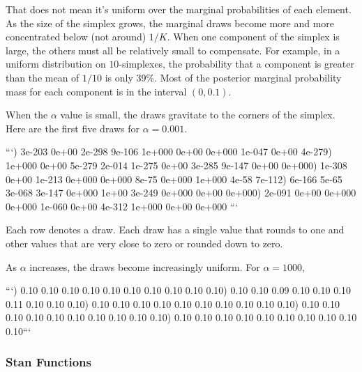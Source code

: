 \begin{description}
That does not mean it's uniform over the marginal probabilities of each element.  As the size of the simplex grows, the marginal draws become more and more concentrated below (not around) $1/K$.  When one component of the simplex is large, the others must all be relatively small to compensate.  For example, in a uniform distribution on $10$-simplexes, the probability that a component is greater than the mean of $1/10$ is only 39\%.  Most of the posterior marginal probability mass for each component is in the interval $(0, 0.1)$.


When the $\alpha$ value is small, the draws gravitate to the corners of the simplex.  Here are the first five draws for $\alpha = 0.001$.


```) 3e-203 0e+00 2e-298 9e-106 1e+000 0e+00 0e+000 1e-047 0e+00 4e-279) 1e+000 0e+00 5e-279 2e-014 1e-275 0e+00 3e-285 9e-147 0e+00 0e+000) 1e-308 0e+00 1e-213 0e+000 0e+000 8e-75 0e+000 1e+000 4e-58 7e-112) 6e-166 5e-65 3e-068 3e-147 0e+000 1e+00 3e-249 0e+000 0e+00 0e+000) 2e-091 0e+00 0e+000 0e+000 1e-060 0e+00 4e-312 1e+000 0e+00 0e+000 ```


Each row denotes a draw.  Each draw has a single value that rounds to one and other values that are very close to zero or rounded down to zero.


As $\alpha$ increases, the draws become increasingly uniform.  For $\alpha = 1000$,


```) 0.10 0.10 0.10 0.10 0.10 0.10 0.10 0.10 0.10 0.10) 0.10 0.10 0.09 0.10 0.10 0.10 0.11 0.10 0.10 0.10) 0.10 0.10 0.10 0.10 0.10 0.10 0.10 0.10 0.10 0.10) 0.10 0.10 0.10 0.10 0.10 0.10 0.10 0.10 0.10 0.10) 0.10 0.10 0.10 0.10 0.10 0.10 0.10 0.10 0.10 0.10\n ```




\subsubsection{Stan Functions}


\begin{description}    \end{description}


\begin{description}  \end{description}



\end{description}
